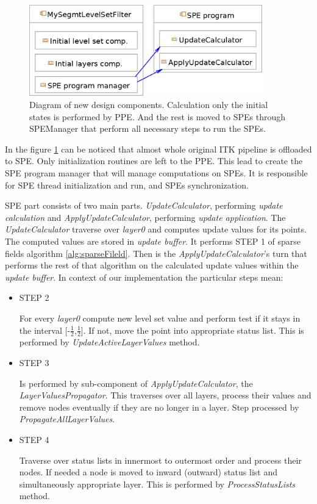 \begin{figure}
    \centering
    \includegraphics[width=0.9\textwidth]{data/newDesign}
    \caption[Diagram of new design components]
{
Diagram of new design components. Calculation only the initial states is performed by PPE.
And the rest is moved to SPEs through SPEManager that perform all necessary steps to run the SPEs.
}
\label{fg:newDesign}
\end{figure}

In the figure \ref{fg:newDesign} can be noticed that almost whole original ITK pipeline is offloaded to SPE.
Only initialization routines are left to the PPE.
This lead to create the SPE program manager that will manage computations on SPEs.
It is responsible for SPE thread initialization and run, and SPEs synchronization.

SPE part consists of two main parts.
\mbox{\emph{UpdateCalculator}}, performing \emph{update calculation} and \mbox{\emph{ApplyUpdateCalculator}}, performing \emph{update application}.
The \mbox{\emph{UpdateCalculator}} traverse over \emph{layer0} and computes update values for its points.
The computed values are stored in \emph{update buffer}.
It performs STEP 1 of sparse fields algorithm \ref{alg:sparseFileld}.
Then is the \mbox{\emph{ApplyUpdateCalculator}}'s turn that performs the rest of that algorithm on the calculated update values within the \emph{update buffer}.
In context of our implementation the particular steps mean:\\

\begin{itemize}
\item STEP 2
\par
For every \emph{layer0} compute new level set value and perform test if it stays in the interval [-$\frac{1}{2}$,$\frac{1}{2}$].
If not, move the point into appropriate status list.
This is performed by \mbox{\emph{UpdateActiveLayerValues}} method.

\item STEP 3
\par
Is performed by sub-component of \mbox{\emph{ApplyUpdateCalculator}}, the \mbox{\emph{LayerValuesPropagator}}.
This traverses over all layers, process their values and remove nodes eventually if they are no longer in a layer.
Step processed by \mbox{\emph{PropagateAllLayerValues}}.

\item STEP 4
\par
Traverse over status lists in innermost to outermost order and process their nodes.
If needed a node is moved to inward (outward) status list and simultaneously appropriate layer.
This is performed by \mbox{\emph{ProcessStatusLists}} method.
\end{itemize}

